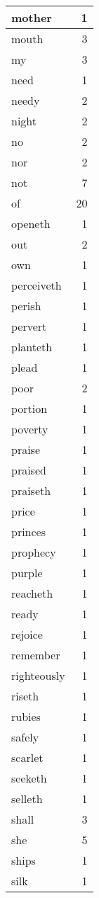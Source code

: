 \begin{center}
\begin{longtable}{l|r}
mother & 1\\ \hline 
mouth & 3\\ \hline 
my & 3\\ \hline 
need & 1\\ \hline 
needy & 2\\ \hline 
night & 2\\ \hline 
no & 2\\ \hline 
nor & 2\\ \hline 
not & 7\\ \hline 
of & 20\\ \hline 
openeth & 1\\ \hline 
out & 2\\ \hline 
own & 1\\ \hline 
perceiveth & 1\\ \hline 
perish & 1\\ \hline 
pervert & 1\\ \hline 
planteth & 1\\ \hline 
plead & 1\\ \hline 
poor & 2\\ \hline 
portion & 1\\ \hline 
poverty & 1\\ \hline 
praise & 1\\ \hline 
praised & 1\\ \hline 
praiseth & 1\\ \hline 
price & 1\\ \hline 
princes & 1\\ \hline 
prophecy & 1\\ \hline 
purple & 1\\ \hline 
reacheth & 1\\ \hline 
ready & 1\\ \hline 
rejoice & 1\\ \hline 
remember & 1\\ \hline 
righteously & 1\\ \hline 
riseth & 1\\ \hline 
rubies & 1\\ \hline 
safely & 1\\ \hline 
scarlet & 1\\ \hline 
seeketh & 1\\ \hline 
selleth & 1\\ \hline 
shall & 3\\ \hline 
she & 5\\ \hline 
ships & 1\\ \hline 
silk & 1\\ \hline 

\end{longtable}
\end{center}
